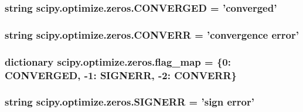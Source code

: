 \subsubsection[{C\+O\+N\+V\+E\+R\+G\+E\+D}]{\setlength{\rightskip}{0pt plus 5cm}string scipy.\+optimize.\+zeros.\+C\+O\+N\+V\+E\+R\+G\+E\+D = 'converged'}\label{namespacescipy_1_1optimize_1_1zeros_ae94fd9b4c3e606a658916b313bbb9c97}
\hypertarget{namespacescipy_1_1optimize_1_1zeros_aa4044a77254dd216fb958ece2ae9ded7}{}
\subsubsection[{C\+O\+N\+V\+E\+R\+R}]{\setlength{\rightskip}{0pt plus 5cm}string scipy.\+optimize.\+zeros.\+C\+O\+N\+V\+E\+R\+R = 'convergence {\bf error}'}\label{namespacescipy_1_1optimize_1_1zeros_aa4044a77254dd216fb958ece2ae9ded7}
\hypertarget{namespacescipy_1_1optimize_1_1zeros_a7e9cc0583205f6b55a4d523a6a3a02d2}{}
\subsubsection[{flag\+\_\+map}]{\setlength{\rightskip}{0pt plus 5cm}dictionary scipy.\+optimize.\+zeros.\+flag\+\_\+map = \{0\+: {\bf C\+O\+N\+V\+E\+R\+G\+E\+D}, -\/1\+: {\bf S\+I\+G\+N\+E\+R\+R}, -\/2\+: {\bf C\+O\+N\+V\+E\+R\+R}\}}\label{namespacescipy_1_1optimize_1_1zeros_a7e9cc0583205f6b55a4d523a6a3a02d2}
\hypertarget{namespacescipy_1_1optimize_1_1zeros_aeebed2989815ce89b4efba74926c6d56}{}
\subsubsection[{S\+I\+G\+N\+E\+R\+R}]{\setlength{\rightskip}{0pt plus 5cm}string scipy.\+optimize.\+zeros.\+S\+I\+G\+N\+E\+R\+R = 'sign {\bf error}'}\label{namespacescipy_1_1optimize_1_1zeros_aeebed2989815ce89b4efba74926c6d56}
